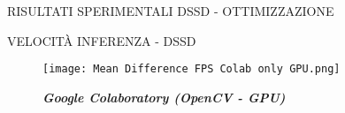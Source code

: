 \begin{subsection}{RISULTATI SPERIMENTALI DSSD - OTTIMIZZAZIONE}
\begin{frame}{VELOCITÀ INFERENZA - DSSD}
\begin{minipage}{\linewidth}
\begin{minipage}{0.45\linewidth}
            \end{minipage}
            \begin{minipage}{0.45\linewidth}
                \begin{figure}
                    \centering
                    \texttt{[image: Mean Difference FPS Colab only GPU.png]}
                    \centering
                    \vspace{-0.5cm} 
                    \caption{{\bfseries{\emph{Google Colaboratory (OpenCV - GPU)}}}}
                \end{figure}
            \end{minipage}
        \end{minipage}
    \end{frame}
\end{subsection}